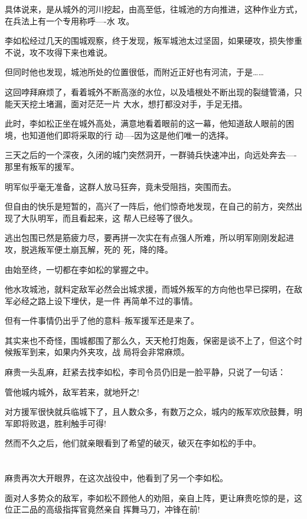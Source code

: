 \documentclass[11pt,a4paper,onecolumn]{article}
\begin{document}
具体说来，是从城外的河川挖起，由高至低，往城池的方向推进，这种作业方式，在兵法上有一个专用称呼----水
攻。

李如松经过几天的围城观察，终于发现，叛军城池太过坚固，如果硬攻，损失惨重不说，攻不攻得下来也难说。

但同时他也发现，城池所处的位置很低，而附近正好也有河流，于是……

这回哱拜麻烦了，看着城外不断高涨的水位，以及墙根处不断出现的裂缝管涌，只能天天挖土堵漏，面对茫茫一片
大水，想打都没对手，手足无措。

此时，李如松正坐在城外高处，满意地看着眼前的这一幕，他知道敌人眼前的困境，也知道他们即将采取的行
动----因为这是他们唯一的选择。

三天之后的一个深夜，久闭的城门突然洞开，一群骑兵快速冲出，向远处奔去----那里有叛军的援军。

明军似乎毫无准备，这群人放马狂奔，竟未受阻挡，突围而去。

但自由的快乐是短暂的，高兴了一阵后，他们惊奇地发现，在自己的前方，突然出现了大队明军，而且看起来，这
帮人已经等了很久。

逃出包围已然是筋疲力尽，要再拼一次实在有点强人所难，所以明军刚刚发起进攻，脱逃叛军便土崩瓦解，死的
死，降的降。

由始至终，一切都在李如松的掌握之中。

他水攻城池，就料定敌军必然会出城求援，而城外叛军的方向他也早已探明，在敌军必经之路上设下埋伏，是一件
再简单不过的事情。

但有一件事情仍出乎了他的意料--叛军援军还是来了。

其实来也不奇怪，围城都围了那么久，天天枪打炮轰，保密是谈不上了，但这个时候叛军到来，如果内外夹攻，战
局将会非常麻烦。

麻贵一头乱麻，赶紧去找李如松，李司令员仍旧是一脸平静，只说了一句话：

管他城内城外，敌军若来，就地歼之!

对方援军很快就兵临城下了，且人数众多，有数万之众，城内的叛军欢欣鼓舞，明军即将败退，胜利触手可得!

然而不久之后，他们就亲眼看到了希望的破灭，破灭在李如松的手中。

\section[\thesection]{}

麻贵再次大开眼界，在这次战役中，他看到了另一个李如松。

面对人多势众的敌军，李如松不顾他人的劝阻，亲自上阵，更让麻贵吃惊的是，这位正二品的高级指挥官竟然亲自
挥舞马刀，冲锋在前!
\end{document}
